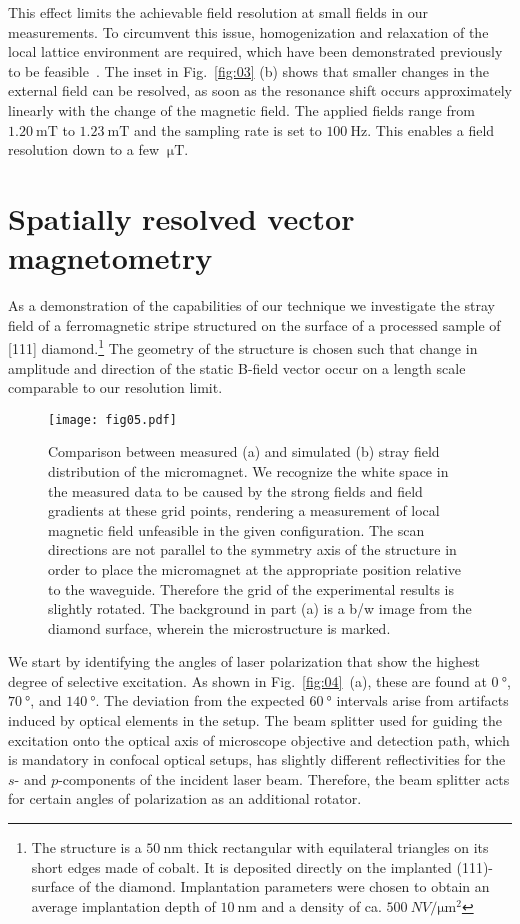 \documentclass[
 reprint,
 amsmath,
 amssymb,
aps,
 prb,
showpacs
]{revtex4-1}
\begin{document}
This effect limits the achievable field resolution at small fields in our measurements. To circumvent this issue, homogenization and relaxation of the local lattice environment are required, which have been demonstrated previously to be feasible~\cite{implantovergrow}. The inset in Fig.~\ref{fig:03} (b) shows that smaller changes in the external field can be resolved, as soon as the resonance shift occurs approximately linearly with the change of the magnetic field. The applied fields range from $\SI{1.20}{\milli\tesla}$ to $\SI{1.23}{\milli\tesla}$ and the sampling rate is set to $\SI{100}{\hertz}$. This enables a field resolution down to a few $\SI{}{\micro\tesla}$.

\section{Spatially resolved vector magnetometry}

As a demonstration of the capabilities of our technique we investigate the stray field of a ferromagnetic stripe structured on the surface of a processed sample of [111] diamond.\footnote{The structure is a $\SI{50}{\nano\meter}$ thick rectangular with equilateral triangles on its short edges made of cobalt. It is deposited directly on the implanted (111)-surface of the diamond. Implantation parameters were chosen to obtain an average implantation depth of $\SI{10}{\nano\meter}$ and a density of ca. $\SI{500}{NV\per\micro\square\meter}$} The geometry of the structure is chosen such that change in amplitude and direction of the static B-field vector occur on a length scale comparable to our resolution limit.

\begin{figure*}[ht]
\texttt{[image: fig05.pdf]}
\caption{Comparison between measured (a) and simulated (b) stray field distribution of the micromagnet. We recognize the white space in the measured data to be caused by the strong fields and field gradients at these grid points, rendering a measurement of local magnetic field unfeasible in the given configuration. The scan directions are not parallel to the symmetry axis of the structure in order to place the micromagnet at the appropriate position relative to the waveguide. Therefore the grid of the experimental results is slightly rotated. The background in part (a) is a b/w image from the diamond surface, wherein the microstructure is marked.}
\label{fig:05}
\end{figure*}

We start by identifying the angles of laser polarization that show the highest degree of selective excitation. As shown in Fig.~\ref{fig:04}~(a), these are found at $\SI{0}{\degree}$, $\SI{70}{\degree}$, and $\SI{140}{\degree}$. The deviation from the expected $\SI{60}{\degree}$ intervals arise from artifacts induced by optical elements in the setup. The beam splitter used for guiding the excitation onto the optical axis of microscope objective and detection path, which is mandatory in confocal optical setups, has slightly different reflectivities for the $s$- and $p$-components of the incident laser beam. Therefore, the beam splitter acts for certain angles of polarization as an additional rotator.
\end{document}
